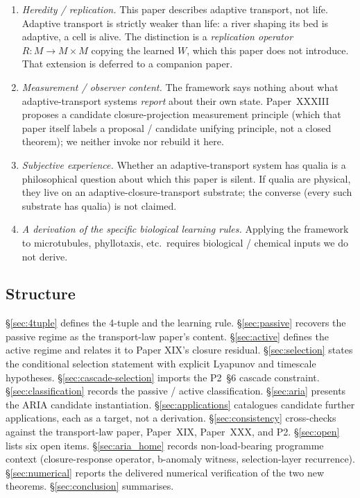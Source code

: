 \documentclass[11pt]{article}
\theoremstyle{definition}
\begin{document}
\begin{enumerate}
    \item \emph{Heredity / replication.} This paper describes adaptive transport, not life. Adaptive transport is strictly weaker than life: a river shaping its bed is adaptive, a cell is alive. The distinction is a \emph{replication operator} $R: M \to M \times M$ copying the learned $W$, which this paper does not introduce. That extension is deferred to a companion paper.
    \item \emph{Measurement / observer content.} The framework says nothing about what adaptive-transport systems \emph{report} about their own state. Paper~XXXIII~\citep{SmartXXXIII} proposes a candidate closure-projection measurement principle (which that paper itself labels a proposal / candidate unifying principle, not a closed theorem); we neither invoke nor rebuild it here.
    \item \emph{Subjective experience.} Whether an adaptive-transport system has qualia is a philosophical question about which this paper is silent. If qualia are physical, they live on an adaptive-closure-transport substrate; the converse (every such substrate has qualia) is not claimed.
    \item \emph{A derivation of the specific biological learning rules.} Applying the framework to microtubules, phyllotaxis, etc.\ requires biological / chemical inputs we do not derive.
\end{enumerate}

\subsection{Structure}

\S\ref{sec:4tuple} defines the 4-tuple and the learning rule.
\S\ref{sec:passive} recovers the passive regime as the transport-law paper's content.
\S\ref{sec:active} defines the active regime and relates it to Paper XIX's closure residual.
\S\ref{sec:selection} states the conditional selection statement with explicit Lyapunov and timescale hypotheses.
\S\ref{sec:cascade-selection} imports the P2~\S 6 cascade constraint.
\S\ref{sec:classification} records the passive / active classification.
\S\ref{sec:aria} presents the ARIA candidate instantiation.
\S\ref{sec:applications} catalogues candidate further applications, each as a target, not a derivation.
\S\ref{sec:consistency} cross-checks against the transport-law paper, Paper~XIX, Paper~XXX, and P2.
\S\ref{sec:open} lists six open items.
\S\ref{sec:aria_home} records non-load-bearing programme context (closure-response operator, b-anomaly witness, selection-layer recurrence).
\S\ref{sec:numerical} reports the delivered numerical verification of the two new theorems.
\S\ref{sec:conclusion} summarises.
\end{document}

